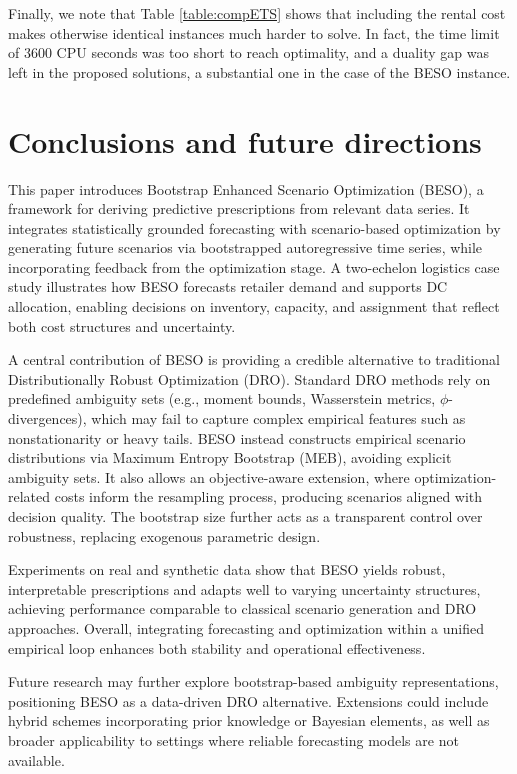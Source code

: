\documentclass[11pt]{article}
\begin{document}
Finally, we note that Table \ref{table:compETS} shows that including the rental cost makes otherwise identical instances much harder to solve. In fact, the time limit of 3600 CPU seconds was too short to reach optimality, and a duality gap was left in the proposed solutions, a substantial one in the case of the BESO instance.

\section{Conclusions and future directions} \label{Sec:conclusions}

This paper introduces Bootstrap Enhanced Scenario Optimization (BESO), a framework for deriving predictive prescriptions from  relevant data series. It integrates statistically grounded forecasting with scenario-based optimization by generating future scenarios via bootstrapped autoregressive time series, while incorporating feedback from the optimization stage. A two-echelon logistics case study illustrates how BESO forecasts retailer demand and supports DC allocation, enabling decisions on inventory, capacity, and assignment that reflect both cost structures and uncertainty.

A central contribution of BESO is providing a credible alternative to traditional Distributionally Robust Optimization (DRO). Standard DRO methods rely on predefined ambiguity sets (e.g., moment bounds, Wasserstein metrics, $\phi$-divergences), which may fail to capture complex empirical features such as nonstationarity or heavy tails. BESO instead constructs empirical scenario distributions via Maximum Entropy Bootstrap (MEB), avoiding explicit ambiguity sets. It also allows an objective-aware extension, where optimization-related costs inform the resampling process, producing scenarios aligned with decision quality. The bootstrap size further acts as a transparent control over robustness, replacing exogenous parametric design.

Experiments on real and synthetic data show that BESO yields robust, interpretable prescriptions and adapts well to varying uncertainty structures, achieving performance comparable to classical scenario generation and DRO approaches. Overall, integrating forecasting and optimization within a unified empirical loop enhances both stability and operational effectiveness.

Future research may further explore bootstrap-based ambiguity representations, positioning BESO as a data-driven DRO alternative. Extensions could include hybrid schemes incorporating prior knowledge or Bayesian elements, as well as broader applicability to settings where reliable forecasting models are not available.
\end{document}
